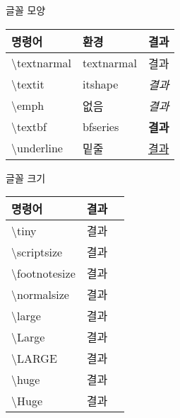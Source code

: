 \documentclass[ aspectratio=149,  10pt,blue,xcolor=pdftex,dvipsnames,table,handout,notes]{beamer}
\begin{document}





		\begin{frame}[t,allowframebreaks]{글꼴 모양}

			\begin{table}
			\begin{tabular}{ l l l  }
				명령어	&환경	&결과\\
				\hline
				\textbackslash textnarmal 	&textnarmal 	&\textnormal{결과}\\
				\textbackslash textit 		&itshape		&\textit{결과}\\
				\textbackslash emph 		&없음		&\emph{결과}\\
				\textbackslash textbf 		&bfseries		&\textbf{결과}\\
				\textbackslash underline 	&밑줄		&\underline{결과}\\
			\end{tabular}
			\end{table}

		\note[item]{}
		\end{frame}







		\begin{frame}[t,allowframebreaks]{글꼴 크기}

			\begin{table}
			\begin{tabular}{ l l l  }
				명령어		&결과\\
				\hline
				\textbackslash tiny			&\tiny{결과}\\
				\textbackslash scriptsize		&\scriptsize{결과}\\
				\textbackslash footnotesize		&\footnotesize{결과}\\
				\textbackslash normalsize		&\normalsize{결과}\\
				\textbackslash large			&\large{결과}\\
				\textbackslash Large			&\Large{결과}\\
				\textbackslash LARGE			&\LARGE{결과}\\
				\textbackslash huge			&\huge{결과}\\
				\textbackslash Huge			&\Huge{결과}\\
			\end{tabular}
			\end{table}

		\note[item]{}
		\end{frame}
\end{document}
